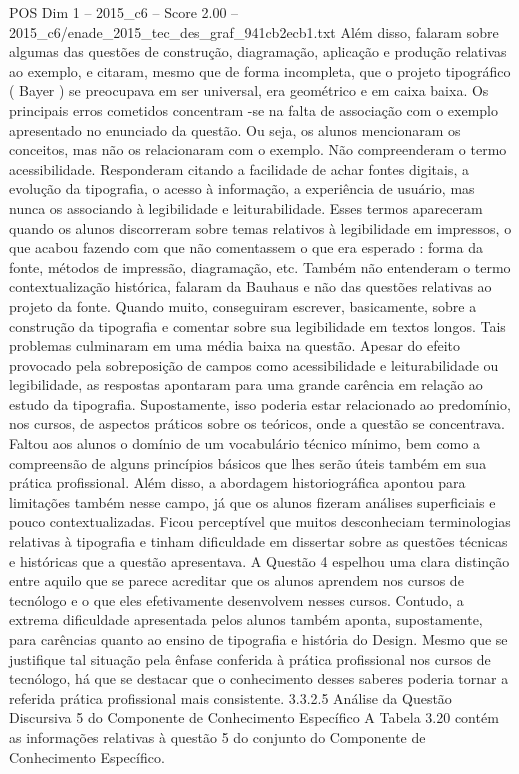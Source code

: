 \begin{textsample}{POS Dim 1 – 2015\_c6 – Score 2.00 – 2015\_c6/enade\_2015\_tec\_des\_graf\_941cb2ecb1.txt}
Além disso, falaram sobre algumas das questões de construção, diagramação, aplicação e produção relativas ao exemplo, e citaram, mesmo que de forma incompleta, que o projeto tipográfico ( Bayer ) se preocupava em ser universal, era geométrico e em caixa baixa.
Os principais erros cometidos concentram -se na falta de associação com o exemplo apresentado no enunciado da questão.
Ou seja, os alunos mencionaram os conceitos, mas não os relacionaram com o exemplo.
Não compreenderam o termo acessibilidade.
Responderam citando a facilidade de achar fontes digitais, a evolução da tipografia, o acesso à informação, a experiência de usuário, mas nunca os associando à legibilidade e leiturabilidade.
Esses termos apareceram quando os alunos discorreram sobre temas relativos à legibilidade em impressos, o que acabou fazendo com que não comentassem o que era esperado : forma da fonte, métodos de impressão, diagramação, etc.
Também não entenderam o termo contextualização histórica, falaram da Bauhaus e não das questões relativas ao projeto da fonte.
Quando muito, conseguiram escrever, basicamente, sobre a construção da tipografia e comentar sobre sua legibilidade em textos longos.
Tais problemas culminaram em uma média baixa na questão.
Apesar do efeito provocado pela sobreposição de campos como acessibilidade e leiturabilidade ou legibilidade, as respostas apontaram para uma grande carência em relação ao estudo da tipografia.
Supostamente, isso poderia estar relacionado ao predomínio, nos cursos, de aspectos práticos sobre os teóricos, onde a questão se concentrava.
Faltou aos alunos o domínio de um vocabulário técnico mínimo, bem como a compreensão de alguns princípios básicos que lhes serão úteis também em sua prática profissional.
Além disso, a abordagem historiográfica apontou para limitações também nesse campo, já que os alunos fizeram análises superficiais e pouco contextualizadas.
Ficou perceptível que muitos desconheciam terminologias relativas à tipografia e tinham dificuldade em dissertar sobre as questões técnicas e históricas que a questão apresentava.
A Questão 4 espelhou uma clara distinção entre aquilo que se parece acreditar que os alunos aprendem nos cursos de tecnólogo e o que eles efetivamente desenvolvem nesses cursos.
Contudo, a extrema dificuldade apresentada pelos alunos também aponta, supostamente, para carências quanto ao ensino de tipografia e história do Design.
Mesmo que se justifique tal situação pela ênfase conferida à prática profissional nos cursos de tecnólogo, há que se destacar que o conhecimento desses saberes poderia tornar a referida prática profissional mais consistente. 3.3.2.5 Análise da Questão Discursiva 5 do Componente de Conhecimento Específico A Tabela 3.20 contém as informações relativas à questão 5 do conjunto do Componente de Conhecimento Específico.

\end{textsample}
